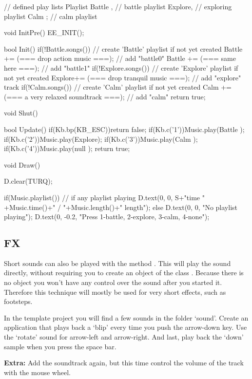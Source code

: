 \begin{code}
// defined play lists
Playlist Battle , // battle playlist 
         Explore, // exploring playlist
         Calm   ; // calm playlist

void InitPre()
{
   EE_INIT();
}

bool Init()
{
   if(!Battle.songs()) // create 'Battle' playlist if not yet created
   {
      Battle += (=== drop action music ===); // add "battle0" 
      Battle += (=== same here ===); // add "battle1" 
   }
   if(!Explore.songs()) // create 'Explore' playlist if not yet created
   {
      Explore+= (=== drop tranquil music ===); // add "explore" track 
   }
   if(!Calm.songs())  // create 'Calm' playlist if not yet created
   {
      Calm   += (=== a very relaxed soundtrack ===); // add "calm" 
   }
   return true;
}

void Shut()
{
}

bool Update()
{
   if(Kb.bp(KB_ESC))return false;
   if(Kb.c('1'))Music.play(Battle );
   if(Kb.c('2'))Music.play(Explore);
   if(Kb.c('3'))Music.play(Calm   );
   if(Kb.c('4'))Music.play(null   );
   return true;
}

void Draw()
{
   D.clear(TURQ);

   if(Music.playlist()) // if any playlist playing
   {
      D.text(0, 0, S+"time " +Music.time()+" / "+Music.length()+" length");
   }else
   {
      D.text(0, 0, "No playlist playing");
   }
   D.text(0, -0.2, "Press 1-battle, 2-explore, 3-calm, 4-none");
}
\end{code}

\subsection{FX}
Short sounds can also be played with the method . This will play the sound directly, without requiring you to create an object of the class . Because there is no object you won't have any control over the sound after you started it. Therefore this technique will mostly be used for very short effects, such as footsteps. 

\begin{exercise}
In the template project you will find a few sounds in the folder `sound'. Create an application that plays back a `blip' every time you push the arrow-down key. Use the `rotate' sound for arrow-left and arrow-right. And last, play back the `down' sample when you press the space bar.

\textbf{Extra:} Add the soundtrack again, but this time control the volume of the track with the mouse wheel.
\end{exercise}
 